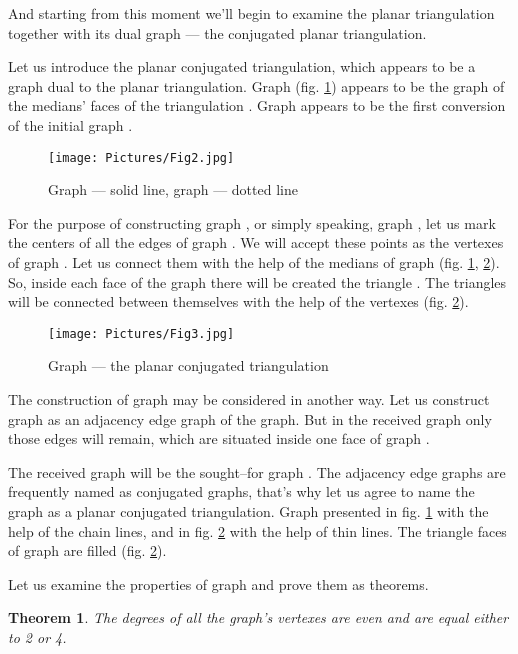 \documentclass{amsart}
\newtheorem{theorem}{Theorem}
\theoremstyle{plain}
\numberwithin{equation}{section}
\begin{document}
And starting from this moment we'll begin to examine the planar triangulation together with its dual graph --- the conjugated planar triangulation.

Let us introduce the planar conjugated triangulation, which appears to be a graph dual to the planar triangulation. Graph  (fig. \ref{Fig:2}) appears to be the graph of the medians' faces of the triangulation . Graph  appears to be the first conversion of the initial graph  \cite {Malinin}.

\begin{figure}[htb]
	\texttt{[image: Pictures/Fig2.jpg]}
	\caption{Graph  --- solid line, graph  --- dotted line}
	\label{Fig:2}
\end{figure}

For the purpose of constructing graph , or simply speaking, graph , let us mark the centers of all the edges of graph . We will accept these points as the vertexes  of graph . Let us connect them with the help of the medians of graph  (fig. \ref{Fig:2}, \ref{Fig:3}). So, inside each face  of the graph  there will be created the triangle . The triangles will be connected between themselves with the help of the vertexes (fig. \ref{Fig:3}).

\begin{figure}[htb]
	\texttt{[image: Pictures/Fig3.jpg]}
	\caption{Graph  --- the planar conjugated triangulation}
	\label{Fig:3}
\end{figure}

The construction of graph  may be considered in another way. Let us construct graph  as an adjacency edge graph of the  graph. But in the received graph  only those edges will remain, which are situated inside one  face of graph .

The received graph will be the sought--for graph . 
The adjacency edge graphs are frequently named as conjugated graphs, that's why let us agree to name the graph  as a planar conjugated triangulation. Graph  presented in fig. \ref{Fig:2} with the help of the chain lines, and in fig. \ref{Fig:3} with the help of thin lines. The triangle faces of graph  are filled (fig. \ref{Fig:3}).

Let us examine the properties of graph  and prove them as theorems.

\begin{theorem}
The degrees of all the  graph's vertexes are even and are equal either to 2 or 4.
\end {theorem}
\end{document}
